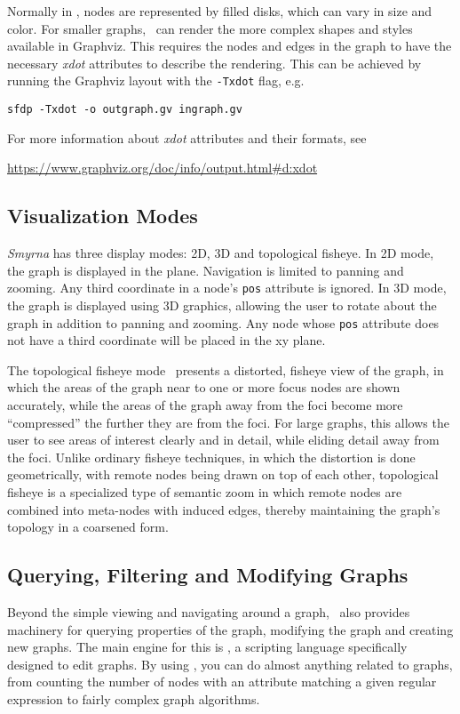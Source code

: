 Normally in \smyrna, nodes are represented by filled disks, which
can vary in size and color. For smaller graphs, \smyrna\ 
can render the more complex shapes and styles available in Graphviz.
This requires the nodes and edges in the graph to have the necessary
{\it xdot} attributes to describe the rendering. This can be achieved
by running the Graphviz layout with the {\tt -Txdot} flag, e.g.
\begin{center}
{\tt sfdp -Txdot -o outgraph.gv ingraph.gv}
\end{center}
For more information about {\it xdot} attributes and their formats,
see
\begin{center}
\url{https://www.graphviz.org/doc/info/output.html#d:xdot}
\end{center}

\subsection{Visualization Modes} 
\label{sec:vizmodes}
{\it Smyrna} has three display modes:
2D, 3D and topological fisheye. 
In 2D mode, the graph is displayed in the plane. Navigation is
limited to panning and zooming. Any third coordinate in a
node's {\tt pos} attribute is ignored.
In 3D mode, the graph is displayed using 3D graphics, allowing the
user to rotate about the graph in addition to panning and zooming.
Any node whose {\tt pos} attribute does not have a third coordinate
will be placed in the xy plane.

The topological fisheye mode~\cite{topfish} presents a 
distorted, fisheye view of the
graph, in which the areas of the graph near to one or more focus nodes
are shown accurately, while the areas of the graph away from the foci
become more ``compressed'' the further they are from the foci.
For large graphs, this allows the user to see areas of interest clearly
and in detail, while eliding detail away from the foci.
Unlike ordinary fisheye techniques, in which
the distortion is done geometrically, with remote nodes being
drawn on top of each other, 
topological fisheye is a specialized type of semantic zoom in which
remote nodes are combined into meta-nodes with induced edges, thereby
maintaining the graph's topology in a coarsened form.

\subsection{Querying, Filtering and Modifying Graphs}   
Beyond the simple viewing and navigating around a graph, \smyrna\
also provides machinery for querying properties of the graph, modifying
the graph and creating new graphs. The main engine for this is \gvpr,
a scripting language specifically designed to edit graphs. By using 
\gvpr, you can do almost anything related to graphs, from counting 
the number of nodes with an attribute matching a given regular expression to
fairly complex graph algorithms.

